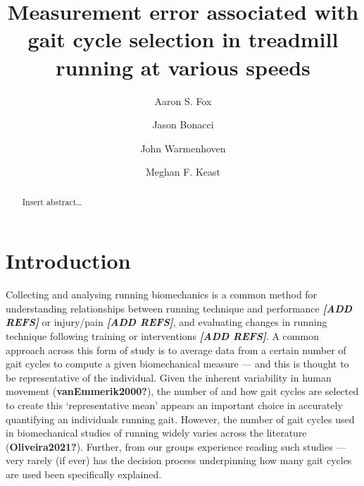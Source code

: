 \documentclass[]{elsarticle} %
\begin{document}
\begin{frontmatter}

  \title{Measurement error associated with gait cycle selection in
treadmill running at various speeds}
    \author[Centre for Sport Research]{Aaron S. Fox}
  
    \author[Centre for Sport Research]{Jason Bonacci}
  
    \author[UNSW]{John Warmenhoven}
  
    \author[Centre for Sport Research]{Meghan F. Keast}
  
      \address[Centre for Sport Research]{Centre for Sport Research,
School of Exercise and Nutrition Sciences, Deakin University, Geelong,
Australia}
    \address[UNSW]{School of Engineering and Information Technology,
University of New South Wales, Canberra, Australia}
  
  \begin{abstract}
  Insert abstract\ldots{}
  \end{abstract}
  
 \end{frontmatter}

\hypertarget{introduction}{%
\section{Introduction}\label{introduction}}

Collecting and analysing running biomechanics is a common method for
understanding relationships between running technique and performance
\textbf{\emph{{[}ADD REFS{]}}} or injury/pain \textbf{\emph{{[}ADD
REFS{]}}}, and evaluating changes in running technique following
training or interventions \textbf{\emph{{[}ADD REFS{]}}}. A common
approach across this form of study is to average data from a certain
number of gait cycles to compute a given biomechanical measure --- and
this is thought to be representative of the individual. Given the
inherent variability in human movement (\textbf{vanEmmerik2000?}), the
number of and how gait cycles are selected to create this
`representative mean' appears an important choice in accurately
quantifying an individuals running gait. However, the number of gait
cycles used in biomechanical studies of running widely varies across the
literature (\textbf{Oliveira2021?}). Further, from our groups experience
reading such studies --- very rarely (if ever) has the decision process
underpinning how many gait cycles are used been specifically explained.
\end{document}
